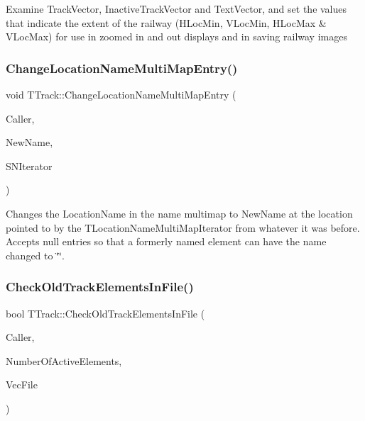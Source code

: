 Examine Track\+Vector, Inactive\+Track\+Vector and Text\+Vector, and set the values that indicate the extent of the railway (H\+Loc\+Min, V\+Loc\+Min, H\+Loc\+Max \& V\+Loc\+Max) for use in zoomed in and out displays and in saving railway images \mbox{\label{class_t_track_aa081ea276995a63dfa00fc0ace24f5c5}} 
\subsubsection{\texorpdfstring{Change\+Location\+Name\+Multi\+Map\+Entry()}{ChangeLocationNameMultiMapEntry()}}
{\footnotesize\ttfamily void T\+Track\+::\+Change\+Location\+Name\+Multi\+Map\+Entry (\begin{DoxyParamCaption}\item[{int}]{Caller,  }\item[{Ansi\+String}]{New\+Name,  }\item[{T\+Location\+Name\+Multi\+Map\+Iterator}]{S\+N\+Iterator }\end{DoxyParamCaption})}

Changes the Location\+Name in the name multimap to New\+Name at the location pointed to by the T\+Location\+Name\+Multi\+Map\+Iterator from whatever it was before. Accepts null entries so that a formerly named element can have the name changed to \char`\"{}\char`\"{}. \mbox{\label{class_t_track_a07cde3507d67aff8eac4255ef28fde16}} 
\subsubsection{\texorpdfstring{Check\+Old\+Track\+Elements\+In\+File()}{CheckOldTrackElementsInFile()}}
{\footnotesize\ttfamily bool T\+Track\+::\+Check\+Old\+Track\+Elements\+In\+File (\begin{DoxyParamCaption}\item[{int}]{Caller,  }\item[{int \&}]{Number\+Of\+Active\+Elements,  }\item[{std\+::ifstream \&}]{Vec\+File }\end{DoxyParamCaption})}

